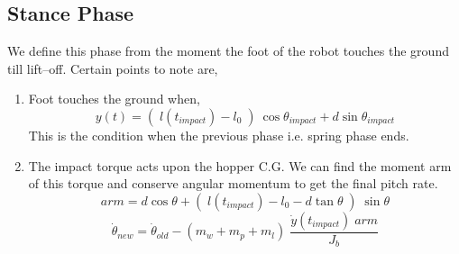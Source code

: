 \subsection*{Stance Phase}
\label{subsec:4_stance_phase}
We define this phase from the moment the foot of the robot touches the ground till lift--off. Certain points to note are,
\begin{enumerate}
  \item
  Foot touches the ground when,
  \begin{equation}
  y(t) = (\;l(t_{impact}) - l_0\;)\:\cos \theta_{impact} + d \sin \theta_{impact}
  \end{equation}
  This is the condition when the previous phase i.e. spring phase ends.
  \item
  The impact torque acts upon the hopper C.G. We can find the moment arm of this torque and conserve angular momentum to get the final pitch rate.
  \begin{equation}
  arm = d \cos \theta + (\;l(t_{impact}) - l_0 - d \tan \theta\;)\;\sin \theta
  \end{equation}
  \begin{equation}
  \dot{\theta}_{new} = \dot{\theta}_{old} - (m_w + m_p + m_l)\; \frac{\dot{y}(t_{impact})\;arm}{J_b}
  \end{equation}


\end{enumerate}
